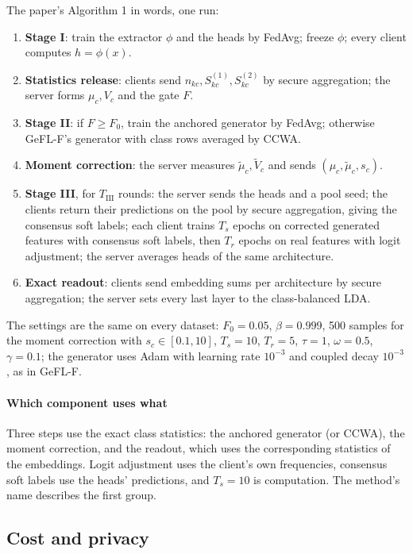 The paper's Algorithm 1 in words, one run:
\begin{enumerate}
\item \textbf{Stage I}: train the extractor $\phi$ and the heads by FedAvg; freeze $\phi$; every client computes
$h=\phi(x)$.
\item \textbf{Statistics release}: clients send $n_{kc},S^{(1)}_{kc},S^{(2)}_{kc}$ by secure aggregation; the server
forms $\mu_c,V_c$ and the gate $F$.
\item \textbf{Stage II}: if $F\ge F_0$, train the anchored generator by FedAvg; otherwise GeFL-F's generator with class
rows averaged by CCWA.
\item \textbf{Moment correction}: the server measures $\tilde\mu_c,\tilde V_c$ and sends $(\mu_c,\tilde\mu_c,s_c)$.
\item \textbf{Stage III}, for $T_{\mathrm{III}}$ rounds: the server sends the heads and a pool seed; the clients
return their predictions on the pool by secure aggregation, giving the consensus soft labels; each client trains
$T_s$ epochs on corrected generated features with consensus soft labels, then $T_r$ epochs on real features with logit
adjustment; the server averages heads of the same architecture.
\item \textbf{Exact readout}: clients send embedding sums per architecture by secure aggregation; the server sets
every last layer to the class-balanced LDA.
\end{enumerate}
The settings are the same on every dataset: $F_0=0.05$, $\beta=0.999$, 500 samples for the moment correction with
$s_c\in[0.1,10]$, $T_s=10$, $T_r=5$, $\tau=1$, $\omega=0.5$, $\gamma=0.1$; the generator uses Adam with learning rate
$10^{-3}$ and coupled decay $10^{-3}$, as in GeFL-F.

\paragraph{Which component uses what} Three steps use the exact class statistics: the anchored generator (or CCWA), the
moment correction, and the readout, which uses the corresponding statistics of the embeddings. Logit adjustment uses
the client's own frequencies, consensus soft labels use the heads' predictions, and $T_s=10$ is computation. The
method's name describes the first group.

\subsection{Cost and privacy}\label{sec:s-privacy}

